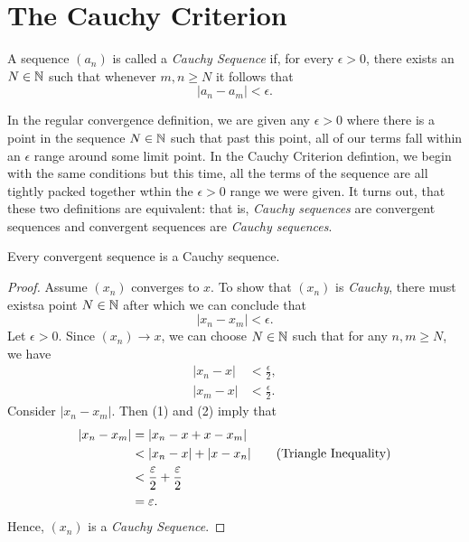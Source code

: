 \section{The Cauchy Criterion}


\begin{definition}
A sequence \((a_n)\) is called a \textit{Cauchy Sequence} if, for every \( \epsilon > 0 \), there exists an \( N \in \mathbb{N} \) such that whenever \( m,n \geq N \) it follows that 
\[ | a_n - a_m | < \epsilon.\]
\end{definition}

In the regular convergence definition, we are given any \( \epsilon > 0 \) where there is a point in the sequence \(N \in \mathbb{N} \) such that past this point, all of our terms fall within an \(\epsilon\) range around some limit point. In the Cauchy Criterion defintion, we begin with the same conditions but this time, all the terms of the sequence are all tightly packed together wthin the \(\epsilon > 0 \) range we were given. It turns out, that these two definitions are equivalent: that is, \textit{Cauchy sequences} are convergent sequences and convergent sequences are \textit{Cauchy sequences}. 

\begin{theorem}
Every convergent sequence is a Cauchy sequence. 
\end{theorem}

\begin{proof}
Assume \((x_n)\) converges to \(x\). To show that \((x_n)\) is \textit{Cauchy}, there must existsa point \( N \in \mathbb{N} \) after which we can conclude that 
\[ |x_n - x_m| < \epsilon. \]
Let \( \epsilon > 0 \). Since \( (x_n) \to x \), we can choose \( N \in \mathbb{N} \) such that for any \( n,m \geq N \), we have 
\begin{align*}
    |x_n - x|&< \frac{\epsilon}{2}, \tag{1} \\
    |x_m - x|&< \frac{\epsilon}{2}. \tag{2}
\end{align*}
Consider \( |x_n - x_m| \). Then (1) and (2) imply that 
\begin{align*}
    |x_n - x_m|&= |x_n - x + x - x_m| \\
               &< | x_n - x | + | x - x_n | \tag{\text{Triangle Inequality}}\\  
               &< \frac{\epsilon}{2} + \frac{\epsilon}{2} \\
               &= \epsilon.
\end{align*}
Hence, \((x_n)\) is a \textit{Cauchy Sequence}.
\end{proof}

